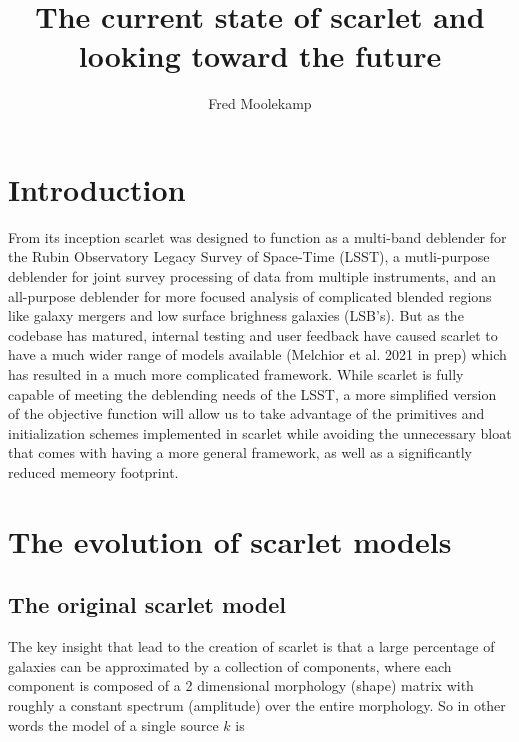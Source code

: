 \documentclass[DM,authoryear,toc]{lsstdoc}
\title{The current state of scarlet and looking toward the future}
\author{%
Fred Moolekamp
}
\date{\vcsDate}
\begin{document}
\mkshorttitle


\section{Introduction}

From its inception scarlet was designed to function as a multi-band deblender for the Rubin Observatory Legacy Survey of Space-Time (LSST), a mutli-purpose deblender for joint survey processing of data from multiple instruments, and an all-purpose deblender for more focused analysis of complicated blended regions like galaxy mergers and low surface brighness galaxies (LSB's). But as the codebase has matured, internal testing and user feedback have caused scarlet to have a much wider range of models available (Melchior et al. 2021 in prep) which has resulted in a much more complicated framework. While scarlet is fully capable of meeting the deblending needs of the LSST, a more simplified version of the objective function will allow us to take advantage of the primitives and initialization schemes implemented in scarlet while avoiding the unnecessary bloat that comes with having a more general framework, as well as a significantly reduced memeory footprint.


\section{The evolution of scarlet models}

\subsection{The original scarlet model} \label{sec:original}

The key insight that lead to the creation of scarlet is that a large percentage of galaxies can be approximated by a collection of components, where each component is composed of a 2 dimensional morphology (shape) matrix with roughly a constant spectrum (amplitude) over the entire morphology. So in other words the model of a single source $k$ is
\end{document}
